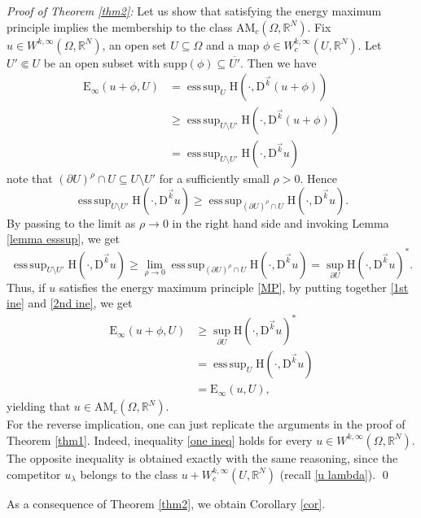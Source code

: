 \documentclass[a4paper,11pt]{article}
\numberwithin{equation}{section}
\newcommand{\numberset}{\mathbb}
\newcommand{\Om}{\Omega}
\newcommand{\R}{\numberset{R}}
\newcommand{\rom}{\mathrm}
\DeclareMathOperator*{\esssup}{ess\,sup}
\theoremstyle{definition}
\begin{document}
\noindent \textit{Proof of Theorem \ref{thm2}:} Let us show that satisfying the energy maximum principle implies the membership to the class $ \mathrm {AM}_c(\Om,\R^N)$. Fix $u\in W^{k,\infty}(\Om,\R^N)$, an open set $U\subseteq\Om$ and a map $\phi\in W^{k,\infty}_c(U,\R^N)$. Let $U'\Subset U$ be an open subset with supp$(\phi)\subseteq \overline{U'}$. Then we have
\begin{equation}\label{1st ine}
\begin{aligned}
\mathrm E_\infty(u+\phi,U)&=\esssup_U \rom{H}(\cdot, \mathrm D^{\vec{k}}(u+\phi))\\
&\geq \esssup_{U\setminus U'}\rom{H}(\cdot, \mathrm D^{\vec{k}}(u+\phi))\\
&=\esssup_{U\setminus U'}\rom{H}(\cdot, \mathrm D^{\vec{k}}u)
\end{aligned}
\end{equation}
note that $(\partial U)^\rho\cap U\subseteq U\setminus U'$ for a sufficiently small $\rho>0$. Hence
$$
\esssup_{U\setminus U'}\rom{H}(\cdot, \mathrm D^{\vec{k}}u)\geq \esssup_{(\partial U)^\rho\cap U}\rom{H}(\cdot, \mathrm D^{\vec{k}}u).
$$
By passing to the limit as $\rho\to   0$ in the right hand side and invoking Lemma \ref{lemma esssup}, we get
\begin{equation}\label{2nd ine}
\esssup_{U\setminus U'}\rom{H}(\cdot, \mathrm D^{\vec{k}}u)\geq \lim_{\rho\to  0}\esssup_{(\partial U)^\rho\cap U}\rom{H}(\cdot, \mathrm D^{\vec{k}}u)=\sup_{\partial U}\rom{H}(\cdot, \mathrm D^{\vec{k}}u)^*.
\end{equation}
Thus, if $u$ satisfies the energy maximum principle \eqref{MP}, by putting together \eqref{1st ine} and \eqref{2nd ine}, we get
\begin{align*}
\mathrm E_\infty(u+\phi,U)&\geq\sup_{\partial U}\rom{H}(\cdot, \mathrm D^{\vec{k}}u)^*\\
&=\esssup_{U}\rom{H}(\cdot, \mathrm D^{\vec{k}}u)\\
&=\mathrm E_\infty(u,U),
\end{align*}
yielding that $u\in \mathrm{AM}_c(\Om,\R^N)$.\\
For the reverse implication, one can just replicate the arguments in the proof of Theorem \ref{thm1}. Indeed, inequality \eqref{one ineq} holds for every $u\in W^{k,\infty}(\Om,\R^N)$. The opposite inequality is obtained exactly with the same reasoning, since the competitor $u_\lambda$ belongs to the class $u+W^{k,\infty}_c(U,\R^N)$ (recall \eqref{u lambda}). \qed
\medskip

As a consequence of Theorem \ref{thm2}, we obtain Corollary \ref{cor}.
\medskip
\end{document}
